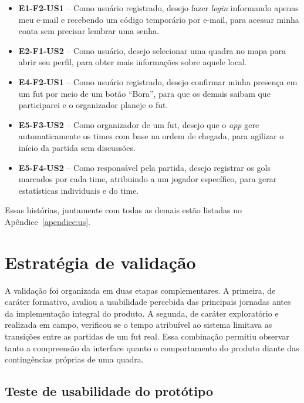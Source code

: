         \begin{itemize}
            \item \textbf{E1-F2-US1} -- Como usuário registrado, desejo fazer \textit{login} informando apenas meu e-mail e recebendo um código temporário por e-mail, para acessar minha conta sem precisar lembrar uma senha.

            \item \textbf{E2-F1-US2} -- Como usuário, desejo selecionar uma quadra no mapa para abrir seu perfil, para obter mais informações sobre aquele local.

            \item \textbf{E4-F2-US1} -- Como usuário registrado, desejo confirmar minha presença em um fut por meio de um botão “Bora”, para que os demais saibam que participarei e o organizador planeje o fut.

            \item \textbf{E5-F3-US2} -- Como organizador de um fut, desejo que o \textit{app} gere automaticamente os times com base na ordem de chegada, para agilizar o início da partida sem discussões.

            \item \textbf{E5-F4-US2} -- Como responsável pela partida, desejo registrar os gols marcados por cada time, atribuindo a um jogador específico, para gerar estatísticas individuais e do time.
        \end{itemize}

        Essas histórias, juntamente com todas as demais estão listadas no Apêndice~\ref{apendice:us}.

\section{Estratégia de validação}
    \label{sec:estrategia-validacao}

    A validação foi organizada em duas etapas complementares. A primeira, de caráter formativo, avaliou a usabilidade percebida das principais jornadas antes da implementação integral do produto. A segunda, de caráter exploratório e realizada em campo, verificou se o tempo atribuível ao sistema limitava as transições entre as partidas de um fut real. Essa combinação permitiu observar tanto a compreensão da interface quanto o comportamento do produto diante das contingências próprias de uma quadra.

    \subsection{Teste de usabilidade do protótipo}

